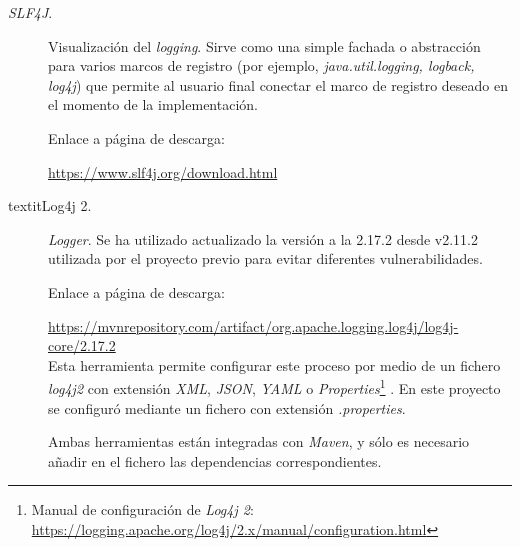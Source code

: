 \begin{description}
	\item[\textit{SLF4J}.] Visualización del \textit{logging}.
	Sirve como una simple fachada o abstracción para varios marcos de registro (por ejemplo, \textit{java.util.logging, logback, log4j}) que permite al usuario final conectar el marco de registro deseado en el momento de la implementación.
	
		Enlace a página de descarga:
	
		\url{https://www.slf4j.org/download.html}
	
	\item[textit{Log4j 2}.] \textit{Logger}. Se ha utilizado actualizado la versión a la 2.17.2 desde v2.11.2 utilizada por el proyecto previo \cite{TFGPrevio} para evitar diferentes vulnerabilidades.

	 	Enlace a página de descarga:
	
	 	\url{https://mvnrepository.com/artifact/org.apache.logging.log4j/log4j-core/2.17.2}\\
		
		Esta herramienta permite configurar este proceso por medio de un fichero \textit{log4j2} con extensión \textit{XML}, \textit{JSON}, \textit{YAML} o \textit{Properties}\footnote{Manual de configuración de \textit{Log4j 2}: \url{https://logging.apache.org/log4j/2.x/manual/configuration.html}} \cite{apache_apache_nodate}. En este proyecto se configuró mediante un fichero con extensión \textit{.properties}. 
		
		Ambas herramientas están integradas con \textit{Maven}, y sólo es necesario añadir en el fichero  las dependencias correspondientes.
	
\end{description}
